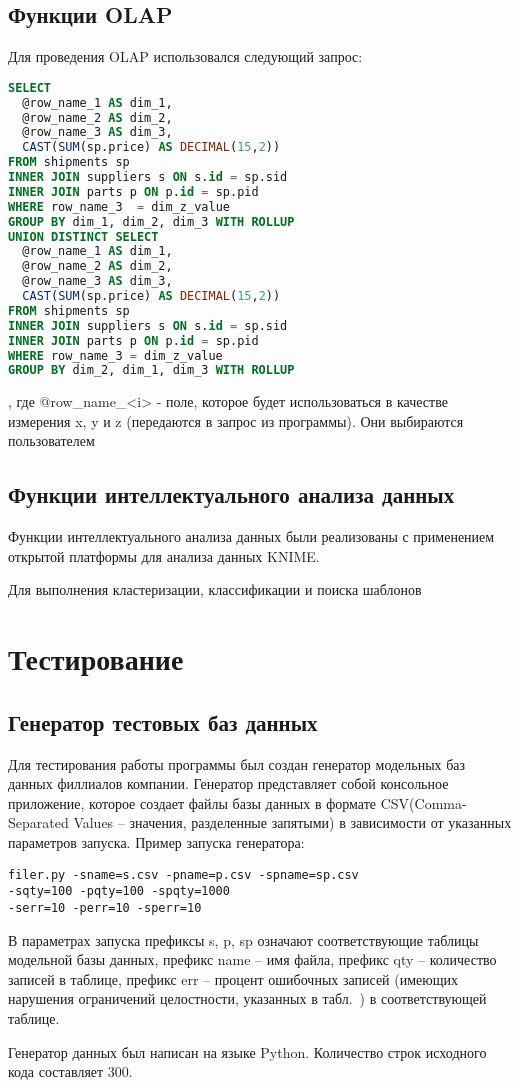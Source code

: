 \subsection{Функции OLAP}
Для проведения OLAP использовался следующий запрос:
\begin{lstlisting}[language=SQL]
SELECT 
  @row_name_1 AS dim_1, 
  @row_name_2 AS dim_2, 
  @row_name_3 AS dim_3, 
  CAST(SUM(sp.price) AS DECIMAL(15,2)) 
FROM shipments sp 
INNER JOIN suppliers s ON s.id = sp.sid 
INNER JOIN parts p ON p.id = sp.pid 
WHERE row_name_3  = dim_z_value 
GROUP BY dim_1, dim_2, dim_3 WITH ROLLUP 
UNION DISTINCT SELECT 
  @row_name_1 AS dim_1, 
  @row_name_2 AS dim_2, 
  @row_name_3 AS dim_3, 
  CAST(SUM(sp.price) AS DECIMAL(15,2)) 
FROM shipments sp 
INNER JOIN suppliers s ON s.id = sp.sid 
INNER JOIN parts p ON p.id = sp.pid 
WHERE row_name_3 = dim_z_value  
GROUP BY dim_2, dim_1, dim_3 WITH ROLLUP
\end{lstlisting},
где @row_name_<i> - поле, которое будет использоваться в качестве измерения x, y и z (передаются в запрос из программы). Они выбираются пользователем 


\subsection{Функции интеллектуального анализа данных}
Функции интеллектуального анализа данных были реализованы с применением открытой платформы для анализа данных KNIME. \par
Для выполнения кластеризации, классификации и поиска шаблонов 

\section{Тестирование}

\subsection{Генератор тестовых баз данных}
Для тестирования работы программы был создан генератор модельных баз данных филлиалов компании. Генератор представляет собой консольное приложение, которое создает файлы базы данных в формате CSV(Comma-Separated  Values – значения, разделенные запятыми) в зависимости от указанных параметров запуска. Пример запуска генератора: 
\begin{lstlisting}
filer.py -sname=s.csv -pname=p.csv -spname=sp.csv
-sqty=100 -pqty=100 -spqty=1000	
-serr=10 -perr=10 -sperr=10
\end{lstlisting}
В параметрах запуска префиксы s, p, sp означают соответствующие таблицы модельной базы данных, префикс name – имя файла, префикс qty – количество записей в таблице, префикс err – процент ошибочных записей (имеющих  нарушения  ограничений  целостности,  указанных  в табл.~) в соответствующей таблице. \par
Генератор данных был написан на языке Python. Количество строк исходного кода составляет 300.\par

